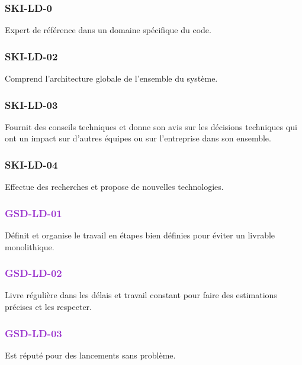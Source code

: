 \documentclass[a4paper, french, openany, 12pt]{book}
\newcommand\dex[1]{\textcolor{BrickRed}{\textbf{\uppercase{ski-{#1}}}}}
\newcommand\str[1]{\textcolor{DarkOrchid}{\textbf{\uppercase{gsd-{#1}}}}}
\begin{document}
\begin{multicols}{2}

  \subsubsection*{\dex{ld-0}}

  Expert de référence dans un domaine spécifique du code.

  \subsubsection*{\dex{ld-02}}

  Comprend l'architecture globale de l'ensemble du système.

  \subsubsection*{\dex{ld-03}}

  Fournit des conseils techniques et donne son avis sur les décisions techniques qui ont un impact sur d'autres équipes ou
  sur l'entreprise dans son ensemble. 

  \subsubsection*{\dex{ld-04}}

  Effectue des recherches et propose de nouvelles technologies.

  \subsubsection*{\str{ld-01}}

  Définit et organise le travail en étapes bien définies pour éviter un livrable monolithique.

  \subsubsection*{\str{ld-02}}

  Livre régulière dans les délais et travail constant pour faire des estimations précises et les respecter.

  \subsubsection*{\str{ld-03}}

  Est réputé pour des lancements sans problème.


\end{multicols}
\end{document}
